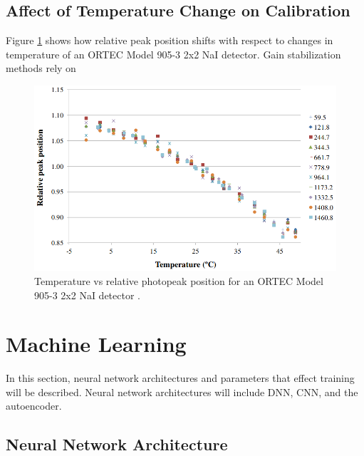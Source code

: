 

\subsection{Affect of Temperature Change on Calibration}


Figure \ref{fig:CASANOVAS2012588} shows how relative peak position shifts with respect to changes in temperature of an ORTEC Model 905-3 2x2 NaI detector. Gain stabilization methods rely on 

\begin{figure}[H]
\centering
\includegraphics[width=0.95\linewidth]{images/temp_vs_relative_peak_position_CASANOVAS2012588}
\caption{Temperature vs relative photopeak position for an ORTEC Model 905-3 2x2 NaI detector \cite{CASANOVAS2012588}.}
\label{fig:CASANOVAS2012588}
\end{figure}




\section{Machine Learning}

In this section, neural network architectures and parameters that effect training will be described. Neural network architectures will include DNN, CNN, and the autoencoder. 

\subsection{Neural Network Architecture}

